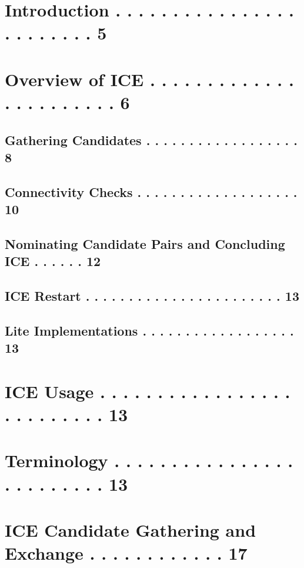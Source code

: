 \documentclass{article}
\begin{document}
\tableofcontents
\newpage

\section{Introduction  . . . . . . . . . . . . . . . . . . . . . . . .   5}

\section{Overview of ICE . . . . . . . . . . . . . . . . . . . . . . .   6}

\subsection{Gathering Candidates  . . . . . . . . . . . . . . . . . .   8}

\subsection{Connectivity Checks . . . . . . . . . . . . . . . . . . .  10}

\subsection{Nominating Candidate Pairs and Concluding ICE . . . . . .  12}

\subsection{ICE Restart . . . . . . . . . . . . . . . . . . . . . . .  13}

\subsection{Lite Implementations  . . . . . . . . . . . . . . . . . .  13}

\section{ICE Usage . . . . . . . . . . . . . . . . . . . . . . . . . .  13}

\section{Terminology . . . . . . . . . . . . . . . . . . . . . . . . .  13}

\section{ICE Candidate Gathering and Exchange  . . . . . . . . . . . .  17}
\end{document}
